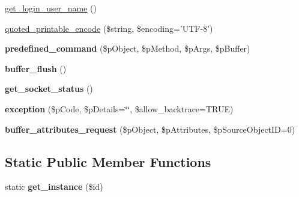 \begin{DoxyCompactItemize}
\item 
\hyperlink{classsteam__connector_a16a69feda63b571198568ac1eabc1685}{get\_\-login\_\-user\_\-name} ()
\item 
\hyperlink{classsteam__connector_a493d1b1a7ef59b90e009a1f2810c1660}{quoted\_\-printable\_\-encode} (\$string, \$encoding='UTF-\/8')
\item 
\hypertarget{classsteam__connector_ab2852893d80cadbb0e5a35a39c03b70e}{
{\bfseries predefined\_\-command} (\$pObject, \$pMethod, \$pArgs, \$pBuffer)}
\label{classsteam__connector_ab2852893d80cadbb0e5a35a39c03b70e}

\item 
\hypertarget{classsteam__connector_a4a6f47125d592ccbd5bf50a0d5e4d5e2}{
{\bfseries buffer\_\-flush} ()}
\label{classsteam__connector_a4a6f47125d592ccbd5bf50a0d5e4d5e2}

\item 
\hypertarget{classsteam__connector_a4723b92a064bbd12a82859f0075842f4}{
{\bfseries get\_\-socket\_\-status} ()}
\label{classsteam__connector_a4723b92a064bbd12a82859f0075842f4}

\item 
\hypertarget{classsteam__connector_a3b1004cd830cdac84104aa38e972aeeb}{
{\bfseries exception} (\$pCode, \$pDetails=\char`\"{}\char`\"{}, \$allow\_\-backtrace=TRUE)}
\label{classsteam__connector_a3b1004cd830cdac84104aa38e972aeeb}

\item 
\hypertarget{classsteam__connector_adf64bce6f35b63c2ac79f13dc9621fc3}{
{\bfseries buffer\_\-attributes\_\-request} (\$pObject, \$pAttributes, \$pSourceObjectID=0)}
\label{classsteam__connector_adf64bce6f35b63c2ac79f13dc9621fc3}

\end{DoxyCompactItemize}
\subsection*{Static Public Member Functions}
\begin{DoxyCompactItemize}
\item 
\hypertarget{classsteam__connector_a630ce59c5c3e6513dcc0ba2bfa31a986}{
static {\bfseries get\_\-instance} (\$id)}
\label{classsteam__connector_a630ce59c5c3e6513dcc0ba2bfa31a986}

\end{DoxyCompactItemize}


